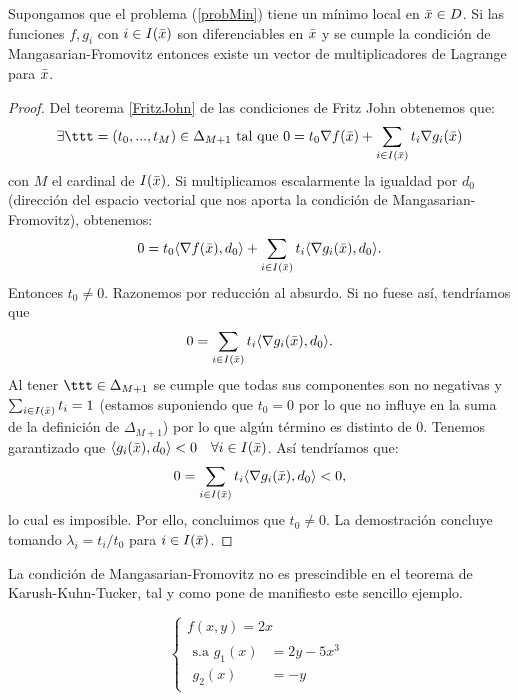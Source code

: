 		\begin{teoremaBox}
		Supongamos que el problema (\ref{probMin}) tiene un mínimo local en $ \bar{x} \in D $. Si las funciones $ f, g_i $ con $ i \in I(\bar{x}) $ son diferenciables en $ \bar{x} $ y se cumple la condición de Mangasarian-Fromovitz entonces existe un vector de multiplicadores de Lagrange para $ \bar{x} $.
		\end{teoremaBox} 
	
		\begin{proof}
		Del teorema \ref{FritzJohn} de las condiciones de Fritz John obtenemos que:
		\[
		\exists \ttt = (t_0, ..., t_{M})\in \Delta_{M+1}  \text{ tal que }0 = t_0 \nabla f(\barx) + \sum_{i \in I(\barx)}  t_i \nabla g_i (\barx)
		\]		
		con $ M $ el cardinal de $ I(\bar{x}) $. Si multiplicamos escalarmente la igualdad por $ d_0 $ (dirección del espacio vectorial que nos aporta la condición de  Mangasarian-Fromovitz), obtenemos:
		\[
		0 = t_0 \langle \nabla f(\bar{x}), d_0 \rangle + \sum_{i \in I(\bar{x})}  t_i \langle \nabla g_i (\bar{x}), d_0 \rangle.
		\]
		Entonces $ t_0 \neq 0$. Razonemos por reducción al absurdo. Si no fuese así, tendríamos que
		\[
		0 = \sum_{i \in I(\bar{x})}  t_i \langle \nabla g_i (\bar{x}), d_0 \rangle.
		\]
		Al tener $ \ttt \in \Delta_{M+1} $ se cumple que todas sus componentes son no negativas y $ \sum_{i \in I(\bar{x})}  t_i = 1 $ (estamos suponiendo que $ t_0 = 0 $ por lo que no influye en la suma de la definición de $ \Delta_{M+1} $) por lo que algún término es distinto de 0. Tenemos garantizado que $  \langle g_i (\bar{x}), d_0 \rangle < 0 \quad \forall i \in I(\bar{x}) $. Así tendríamos que:
			\[
		0 = \sum_{i \in I(\bar{x})}  t_i \langle \nabla g_i (\bar{x}), d_0 \rangle < 0,
		\]
		lo cual es imposible. Por ello, concluimos que $ t_0 \neq 0 $. La demostración concluye tomando $ \lambda_i = t_i / t_0 $ para $ i \in I(\bar{x}) $.
		\end{proof}
		
		
La condición de Mangasarian-Fromovitz no es prescindible en el teorema de Karush-Kuhn-Tucker, tal y como pone de manifiesto este sencillo ejemplo.

\begin{equation*}
\begin{cases}
f(x,y) = 2x\\
\begin{split}
\text{s.a } g_1(x) &= 2y-5x^3 \\
g_2(x) &= -y
\end{split}
\end{cases} 
\end{equation*}

